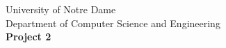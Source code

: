 \documentclass[11pt]{article}
\begin{document}
\pagestyle{empty}

\begin{center}
University of Notre Dame\\
Department of Computer Science and Engineering\\
\vspace{.5in}
{\bf Project 2}\hspace{\fill}\parbox[b]{3in}{}\hspace{\fill}{\bf Shane Ryan}
{\centering\makebox[\textwidth]{\hrulefill}\hfill}

\vspace{5pt}

{\centering\makebox[\textwidth]{\hrulefill}\hfill}

\end{center}
\end{document}
